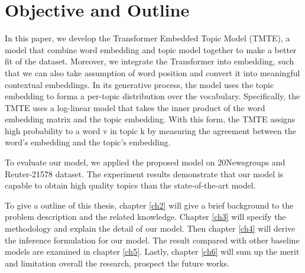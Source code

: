 \section{Objective and Outline}\label{ch1:4}
In this paper, we develop the Transformer Embedded Topic Model (TMTE), a model that combine word embedding and topic model together to make a better fit of the dataset. Moreover, we integrate the Transformer into embedding, such that we can also take assumption of word position and convert it into meaningful contextual embeddings. 
In its generative process, the model uses the topic embedding to forma a per-topic distribution over the vocabulary. Specifically, the TMTE uses a log-linear model that takes the inner product of the word embedding matrix and the topic embedding.
With this form, the TMTE assigns high probability to a word v in topic k by measuring the agreement between the word’s embedding and the topic’s embedding.

To evaluate our model, we applied the proposed model on 20Newsgroups and Reuter-21578 dataset. The experiment results demonstrate that our model is capable to obtain high quality topics than the state-of-the-art model. 

To give a outline of this thesis, chapter \ref{ch2} will give a brief background to the problem description and the related knowledge. Chapter \ref{ch3} will specify the methodology and explain the detail of our model. Then chapter \ref{ch4} will derive the inference formulation for our model. The result compared with other baseline models are examined in chapter \ref{ch5}. Lastly, chapter \ref{ch6} will sum up the merit and limitation overall the research, prospect the future works.